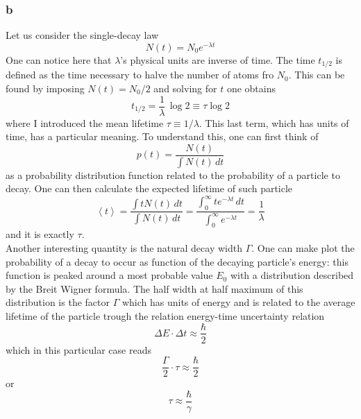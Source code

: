 \subsubsection*{b}
Let us consider the single-decay law 
\begin{equation*}
    N(t) = N_0 e^{-\lambda t}
\end{equation*}
One can notice here that $\lambda$'s physical units are inverse of time. The time $t_{1/2}$ is defined as the time necessary to halve the number of atoms fro $N_0$. 
This can be found by imposing $N(t) = N_0/2$ and solving for $t$ one obtains 
\begin{equation*}
    t_{1/2} = \frac{1}{\lambda} \, \log 2 \equiv \tau \log 2
\end{equation*}
where I introduced the mean lifetime $\tau \equiv 1/\lambda$. This last term, which has units of time, has a particular meaning. To understand this, one can first think 
of 
\begin{equation*}
    p(t) = \frac{N(t)}{\int N(t) \, dt}
\end{equation*} 
as a probability distribution function related to the probability of a particle to decay. One can then calculate the expected lifetime of such particle
\begin{equation*}
    \left\langle t \right\rangle = \frac{\int t N(t) \, dt}{\int N(t) \, dt} = \frac{\int_0^{\infty} te^{-\lambda t} \, dt}{\int_0^{\infty} e^{-\lambda t}} = \frac{1}{\lambda}
\end{equation*}
and it is exactly $\tau$. \\
Another interesting quantity is the natural decay width $\Gamma$. One can make plot the probability of a decay to occur as function of the decaying particle's energy: this function is peaked around
a most probable value $E_0$ with a distribution described by the Breit Wigner formula. The half width at half maximum of this distribution is the factor $\Gamma$ which has units of energy and is related to the average 
lifetime of the particle trough the relation
energy-time uncertainty relation
\begin{equation*}
    \Delta E \cdot \Delta t \approx \frac{\hbar}{2}
\end{equation*}
which in this particular case reads
\begin{equation*}
    \frac{\Gamma}{2} \cdot \tau \approx \frac{\hbar}{2}
\end{equation*}
or 
\begin{equation*}
    \tau \approx \frac{\hbar}{\gamma}
\end{equation*}


